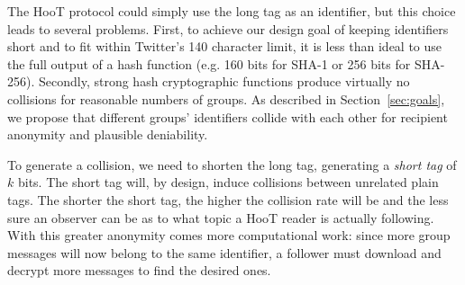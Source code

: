 The HooT protocol could simply use the long tag as an identifier, but
this choice leads to several problems. First, to achieve our design goal
of keeping identifiers short and to fit within Twitter's 140 character
limit, it is less than ideal to use the full output of a hash function
(e.g. 160 bits for SHA-1 or 256 bits for SHA-256). Secondly, strong hash
cryptographic functions produce virtually no collisions for reasonable
numbers of groups. As described in Section~\ref{sec:goals}, we propose
that different groups' identifiers collide with each other for recipient
anonymity and plausible deniability.


To generate a collision, we need to shorten the long tag, generating a
\textit{short tag} of $k$ bits. The short tag will, by design, induce
collisions between unrelated plain tags. The shorter the short tag, the
higher the collision rate will be and the less sure an observer can be
as to what topic a HooT reader is actually following. With this greater
anonymity comes more computational work: since more group messages will
now belong to the same identifier, a follower must download and decrypt
more messages to find the desired ones.

